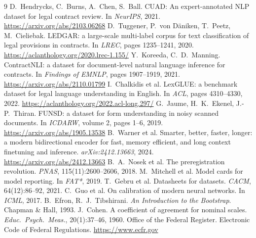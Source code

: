 \documentclass[11pt]{article}
\begin{document}
\begin{thebibliography}{9}
 D.~Hendrycks, C.~Burns, A.~Chen, S.~Ball. CUAD: An expert-annotated NLP dataset for legal contract review. In \emph{NeurIPS}, 2021. \url{https://arxiv.org/abs/2103.06268}
 D.~Tuggener, P.~von D{\"a}niken, T.~Peetz, M.~Cieliebak. LEDGAR: a large-scale multi-label corpus for text classification of legal provisions in contracts. In \emph{LREC}, pages 1235--1241, 2020. \url{https://aclanthology.org/2020.lrec-1.155/}
 Y.~Koreeda, C.~D.~Manning. ContractNLI: a dataset for document-level natural language inference for contracts. In \emph{Findings of EMNLP}, pages 1907--1919, 2021. \url{https://arxiv.org/abs/2110.01799}
 I.~Chalkidis et al. LexGLUE: a benchmark dataset for legal language understanding in English. In \emph{ACL}, pages 4310--4330, 2022. \url{https://aclanthology.org/2022.acl-long.297/}
 G.~Jaume, H.~K.~Ekenel, J.-P.~Thiran. FUNSD: a dataset for form understanding in noisy scanned documents. In \emph{ICDARW}, volume 2, pages 1--6, 2019. \url{https://arxiv.org/abs/1905.13538}
 B.~Warner et al. Smarter, better, faster, longer: a modern bidirectional encoder for fast, memory efficient, and long context finetuning and inference. \emph{arXiv:2412.13663}, 2024. \url{https://arxiv.org/abs/2412.13663}
 B.~A.~Nosek et al. The preregistration revolution. \emph{PNAS}, 115(11):2600--2606, 2018.
 M.~Mitchell et al. Model cards for model reporting. In \emph{FAT*}, 2019.
 T.~Gebru et al. Datasheets for datasets. \emph{CACM}, 64(12):86--92, 2021.
 C.~Guo et al. On calibration of modern neural networks. In \emph{ICML}, 2017.
 B.~Efron, R.~J.~Tibshirani. \emph{An Introduction to the Bootstrap}. Chapman \& Hall, 1993.
 J.~Cohen. A coefficient of agreement for nominal scales. \emph{Educ.\ Psych.\ Meas.}, 20(1):37--46, 1960.
 Office of the Federal Register. Electronic Code of Federal Regulations. \url{https://www.ecfr.gov}
\end{thebibliography}
\end{document}
